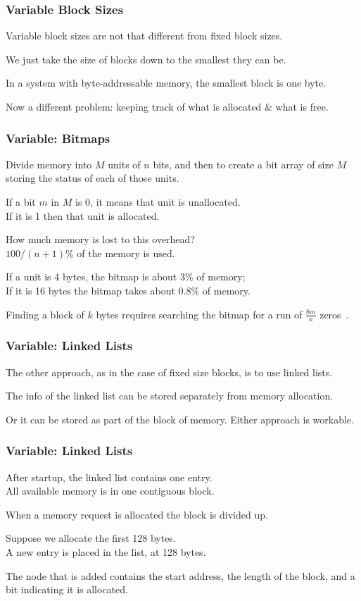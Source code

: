 \begin{frame}
\frametitle{Variable Block Sizes}

Variable block sizes are not that different from fixed block sizes.

We just take the size of blocks down to the smallest they can be. 

In a system with byte-addressable memory, the smallest block is one byte.

Now a different problem: keeping track of what is allocated \& what is free.


\end{frame}

\begin{frame}
\frametitle{Variable: Bitmaps}

Divide memory into $M$ units of $n$ bits, and then to create a bit array of size $M$ storing the status of each of those units. 

If a bit $m$ in $M$ is 0, it means that unit is unallocated.\\
If it is 1 then that unit is allocated. 

How much memory is lost to this overhead?\\
\quad $100/(n+1)$\% of the memory is used. 

If a unit is 4 bytes, the bitmap is about 3\% of memory; \\
If it is 16 bytes the bitmap takes about 0.8\% of memory. 

Finding a block of $k$ bytes requires searching the bitmap for a run of $\frac{8m}{n}$ zeros~.

\end{frame}

\begin{frame}
\frametitle{Variable: Linked Lists}

The other approach, as in the case of fixed size blocks, is to use linked lists. 

The info of the linked list can be stored separately from memory allocation.

Or it can be stored as part of the block of memory. Either approach is workable.

\end{frame}

\begin{frame}
\frametitle{Variable: Linked Lists}

After startup, the linked list contains one entry.\\
\quad  All available memory is in one contiguous block. 

When a memory request is allocated the block is divided up. 

Suppose we allocate the first 128 bytes.\\
\quad A new entry is placed in the list, at 128 bytes. 

The node that is added contains the start address, the length of the block, and a bit indicating it is allocated. 

\end{frame}

